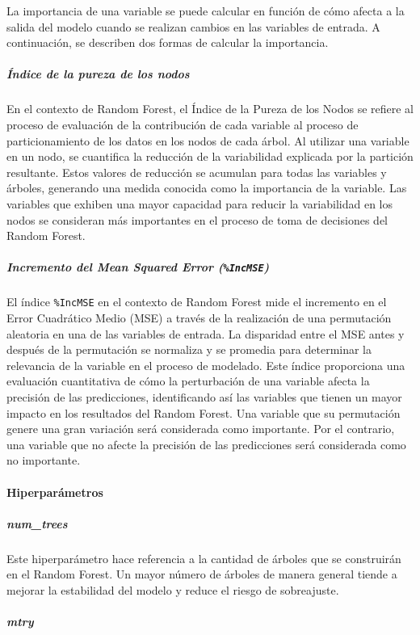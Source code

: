 La importancia de una variable se puede calcular en función de cómo afecta a la salida del modelo cuando se realizan cambios en las variables de entrada. A continuación, se describen dos formas de calcular la importancia.

\subparagraph{Índice de la pureza de los nodos}

En el contexto de Random Forest, el Índice de la Pureza de los Nodos se refiere al proceso de evaluación de la contribución de cada variable al proceso de particionamiento de los datos en los nodos de cada árbol. Al utilizar una variable en un nodo, se cuantifica la reducción de la variabilidad explicada por la partición resultante. Estos valores de reducción se acumulan para todas las variables y árboles, generando una medida conocida como la importancia de la variable. Las variables que exhiben una mayor capacidad para reducir la variabilidad en los nodos se consideran más importantes en el proceso de toma de decisiones del Random Forest.

\subparagraph{Incremento del Mean Squared Error (\texttt{\%IncMSE})}

El índice \texttt{\%IncMSE} en el contexto de Random Forest mide el incremento en el Error Cuadrático Medio (MSE) a través de la realización de una permutación aleatoria en una de las variables de entrada. La disparidad entre el MSE antes y después de la permutación se normaliza y se promedia para determinar la relevancia de la variable en el proceso de modelado. Este índice proporciona una evaluación cuantitativa de cómo la perturbación de una variable afecta la precisión de las predicciones, identificando así las variables que tienen un mayor impacto en los resultados del Random Forest. Una variable que su permutación genere una gran variación será considerada como importante. Por el contrario, una variable que no afecte la precisión de las predicciones será considerada como no importante.

\paragraph{Hiperparámetros}\label{sec:importancia-variables}

\subparagraph{\textit{num\_trees}}

Este hiperparámetro hace referencia a la cantidad de árboles que se construirán en el Random Forest. Un mayor número de árboles de manera general tiende a mejorar la estabilidad del modelo y reduce el riesgo de sobreajuste.

\subparagraph{\textit{mtry}}

